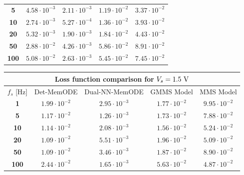 \documentclass[11pt, oneside]{article}
\begin{document}
\begin{table}
\begin{tabular}{c|cccc}
        \textbf{5}   & $4.58 \cdot 10^{-3}$ & \color{ieeegreen} \bfseries $2.11 \cdot 10^{-3}$ & $1.19 \cdot 10^{-2}$ & \color{ieeered} \bfseries $3.37 \cdot 10^{-2}$ \\
        \textbf{10}  & $2.74 \cdot 10^{-3}$ & \color{ieeegreen} \bfseries $5.27 \cdot 10^{-4}$ & $1.36 \cdot 10^{-2}$ & \color{ieeered} \bfseries $3.93 \cdot 10^{-2}$ \\
        \textbf{20}  & $5.32 \cdot 10^{-3}$ & \color{ieeegreen} \bfseries $1.90 \cdot 10^{-3}$ & $1.84 \cdot 10^{-2}$ & \color{ieeered} \bfseries $4.43 \cdot 10^{-2}$ \\
        \textbf{50}  & $2.88 \cdot 10^{-2}$ & \color{ieeegreen} \bfseries $4.26 \cdot 10^{-3}$ & $5.86 \cdot 10^{-2}$ & \color{ieeered} \bfseries $8.91 \cdot 10^{-2}$ \\
        \textbf{100} & $5.08 \cdot 10^{-2}$ & \color{ieeegreen} \bfseries $2.63 \cdot 10^{-3}$ & $5.45 \cdot 10^{-2}$ & \color{ieeered} \bfseries $7.45 \cdot 10^{-2}$ \\
        \bottomrule
    \end{tabular}
    \begin{tabular}{c|cccc}
        \toprule
        \multicolumn{5}{c}{\textbf{Loss function comparison for $V_s = 1.5 \rm \ V$}}                                                                                                            \\
        \midrule
        $f_s$ [Hz]   & Det-MemODE           & Dual-NN-MemODE                                   & GMMS Model                                     & MMS Model                                      \\
        \midrule
        \textbf{1}   & $1.99 \cdot 10^{-2}$ & \color{ieeegreen} \bfseries $2.95 \cdot 10^{-3}$ & $1.77 \cdot 10^{-2}$                           & \color{ieeered} \bfseries $9.95 \cdot 10^{-2}$ \\
        \textbf{5}   & $1.17 \cdot 10^{-2}$ & \color{ieeegreen} \bfseries $1.26 \cdot 10^{-3}$ & $1.73 \cdot 10^{-2}$                           & \color{ieeered} \bfseries $7.88 \cdot 10^{-2}$ \\
        \textbf{10}  & $1.14 \cdot 10^{-2}$ & \color{ieeegreen} \bfseries $2.08 \cdot 10^{-3}$ & $1.56 \cdot 10^{-2}$                           & \color{ieeered} \bfseries $5.24 \cdot 10^{-2}$ \\
        \textbf{20}  & $1.09 \cdot 10^{-2}$ & \color{ieeegreen} \bfseries $5.51 \cdot 10^{-3}$ & $1.96 \cdot 10^{-2}$                           & \color{ieeered} \bfseries $5.09 \cdot 10^{-2}$ \\
        \textbf{50}  & $1.09 \cdot 10^{-2}$ & \color{ieeegreen} \bfseries $3.46 \cdot 10^{-3}$ & $1.87 \cdot 10^{-2}$                           & \color{ieeered} \bfseries $8.90 \cdot 10^{-2}$ \\
        \textbf{100} & $2.44 \cdot 10^{-2}$ & \color{ieeegreen} $1.65 \cdot 10^{-3}$           & \color{ieeered} \bfseries $5.63 \cdot 10^{-2}$ & $4.87 \cdot 10^{-2}$                           \\
        \bottomrule
    \end{tabular}


\end{table}
\end{document}
